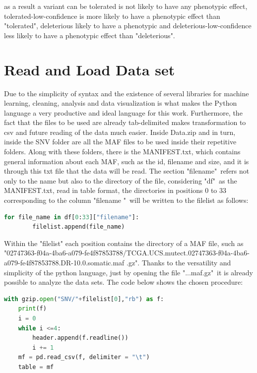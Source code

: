 as a result a variant can be tolerated is not likely to have any phenotypic effect, tolerated-low-confidence is more likely to have a phenotypic effect than "tolerated", deleterious likely to have a phenotypic and deleterious-low-confidence less likely to have a phenotypic effect than "deleterious".


\section{Read and Load Data set} %
\label{sec:readload_data}
\hspace{10px} Due to the simplicity of syntax and the existence of several libraries for machine learning, cleaning, analysis and data visualization is what makes the Python language a very productive and ideal language for this work. Furthermore, the fact that the files to be used are already tab-delimited makes transformation to csv and future reading of the data much easier. Inside Data.zip and in turn, inside the SNV folder are all the MAF files to be used inside their repetitive folders. Along with these folders, there is the MANIFEST.txt, which contains general information about each MAF, such as the id, filename and size, and it is through this txt file that the data will be read. The section "filename"\ refers not only to the name but also to the directory of the file, considering "df"\ as the MANIFEST.txt, read in table format, the directories in positions 0 to 33 corresponding to the column "filename "\ will be written to the filelist as follows:

\begin{lstlisting}[language=Python]
    for file_name in df[0:33]["filename"]:
        filelist.append(file_name)
\end{lstlisting}

Within the "filelist" each position contains the directory of a MAF file, such as "02747363-f04a-4ba6-a079-fe4f87853788/TCGA.UCS.mutect.02747363-f04a-4ba6-a079-fe4f87853788.DR-10.0.somatic.maf .gz". Thanks to the versatility and simplicity of the python language, just by opening the file "...maf.gz"\ it is already possible to analyze the data sets. The code below shows the chosen procedure:

\begin{lstlisting}[language=Python]
 with gzip.open("SNV/"+filelist[0],"rb") as f:
    print(f)
    i = 0
    while i <=4:
        header.append(f.readline())
        i += 1
    mf = pd.read_csv(f, delimiter = "\t")
    table = mf
\end{lstlisting}

